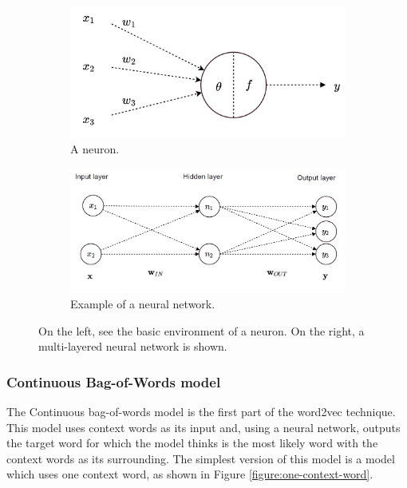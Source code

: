 \documentclass[a4paper,11pt]{article}
\begin{document}
\begin{figure}[h]
\begin{subfigure}{.5\textwidth}
  \centering
  \includegraphics[width=.8\linewidth]{Neuron.png}
  \caption{A neuron.}
  \label{figure:neuron}
\end{subfigure}%
\begin{subfigure}{.6\textwidth}
  \centering
  \includegraphics[width=.9\linewidth]{NeuralNetworkExample.png}
  \caption{Example of a neural network.}
  \label{figure:neuralnetwork}
\end{subfigure}
\caption{On the left, see the basic environment of a neuron. On the right, a multi-layered neural network is shown.}
\label{figure:NeuralNetworks}
\end{figure}

\subsubsection{Continuous Bag-of-Words model}
The Continuous bag-of-words model is the first part of the word2vec technique. This model uses context words as its input and, using a neural network, outputs the target word for which the model thinks is the most likely word with the context words as its surrounding. The simplest version of this model is a model which uses one context word, as shown in Figure \ref{figure:one-context-word}. 
\end{document}
